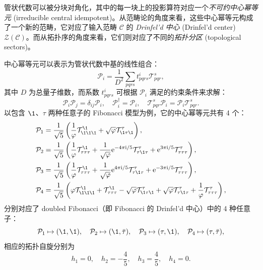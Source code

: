 管状代数可以被分块对角化，其中的每一块上的投影算符对应一个\emph{不可约中心幂等元} (irreducible central idempotent)。从范畴论的角度来看，这些中心幂等元构成了一个新的范畴，它对应了输入范畴 $\mathcal{C}$ 的 \emph{Drinfel'd 中心} (Drinfel'd center) $\mathcal{Z}(\mathcal{C})$。而从拓扑序的角度来看，它们则对应了不同的\emph{拓扑分区} (topological sectors)\cite{lan2014topological,bultinck2017anyons,williamson2017symmetry,vanhove2018mapping}。

中心幂等元可以表示为管状代数中基的线性组合：
\begin{equation}
  \mathcal{P}_{i} = \frac{1}{D^2} \sum_{pqrs} t^i_{pqrs} \mathcal{T}^{s}_{pqr},
\end{equation}
其中 $D$ 为总量子维数，而系数 $t^i_{pqrs}$ 可根据 $\mathcal{P}_{i}$ 满足的约束条件来求解：
\begin{equation}
  \mathcal{P}_{i} \mathcal{P}_{j} = \delta_{ij} \mathcal{P}_{i}, \quad
  \mathcal{P}_{i}^\dagger = \mathcal{P}_{i}, \quad
  \mathcal{T}^{s}_{pqr} \mathcal{P}_{i} = \mathcal{P}_{i} \mathcal{T}^{s}_{pqr}.
\end{equation}
以包含 $\1$、$\tau$ 两种任意子的 Fibonacci 模型为例\cite{bultinck2017anyons}，它的中心幂等元共有 4 个：
\begin{equation}
  \begin{aligned}
    \mathcal{P}_{1} &= \frac{1}{\sqrt5} \left(
      \frac{1}{\varphi} \mathcal{T}^{\1}_{\1\1\1} + \sqrt{\varphi} \mathcal{T}^{\tau}_{\1\tau\1}
    \right), \\
    \mathcal{P}_{2} &= \frac{1}{\sqrt5} \left(
      \frac{1}{\varphi} \mathcal{T}^{\1}_{\tau\tau\tau} + \frac{1}{\sqrt{\varphi}} \ee^{-4\pi\ii/5} \mathcal{T}^{\tau}_{\tau\1\tau} + \ee^{ 3\pi\ii/5} \mathcal{T}^{\tau}_{\tau\tau\tau}
    \right), \\
    \mathcal{P}_{3} &= \frac{1}{\sqrt5} \left(
      \frac{1}{\varphi} \mathcal{T}^{\1}_{\tau\tau\tau} + \frac{1}{\sqrt{\varphi}} \ee^{ 4\pi\ii/5} \mathcal{T}^{\tau}_{\tau\1\tau} + \ee^{-3\pi\ii/5} \mathcal{T}^{\tau}_{\tau\tau\tau}
    \right), \\
    \mathcal{P}_{4} &= \frac{1}{\sqrt5} \left(
      \varphi \mathcal{T}^{\1}_{\1\1\1} + \mathcal{T}^{\1}_{\tau\tau\tau} - \sqrt{\varphi} \mathcal{T}^{\tau}_{\1\tau\1} + \sqrt{\varphi} \mathcal{T}^{\tau}_{\tau\1\tau} + \frac{1}{\varphi} \mathcal{T}^{\tau}_{\tau\tau\tau}
    \right),
  \end{aligned}
  \label{eq:fib-idempotents}
\end{equation}
分别对应了 doubled Fibonacci（即 Fibonacci 的 Drinfel'd 中心）中的 4 种任意子：
\begin{equation}
  \mathcal{P}_{1} \mapsto (\1, \1), \quad
  \mathcal{P}_{2} \mapsto (\1, \bar{\tau}), \quad
  \mathcal{P}_{3} \mapsto (\tau, \1), \quad
  \mathcal{P}_{4} \mapsto (\tau, \bar{\tau}),
\end{equation}
相应的拓扑自旋分别为
\begin{equation}
  h_1 = 0, \quad h_2 = -\frac45, \quad h_3 = \frac45, \quad h_4 = 0.
\end{equation}

